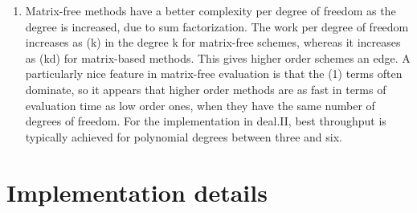 \documentclass[12pt]{article}
\begin{document}
\begin{enumerate}
\item Matrix-free methods have a better complexity per degree of freedom as the degree is increased, due to sum factorization. The work per degree of freedom increases as (k) in the degree k for matrix-free schemes, whereas it increases as (kd) for matrix-based methods. This gives higher order schemes an edge. A particularly nice feature in matrix-free evaluation is that the (1) terms often dominate, so it appears that higher order methods are as fast in terms of evaluation time as low order ones, when they have the same number of degrees of freedom. For the implementation in deal.II, best throughput is typically achieved for polynomial degrees between three and six.
\end{enumerate}

\section{Implementation details}
\end{document}
